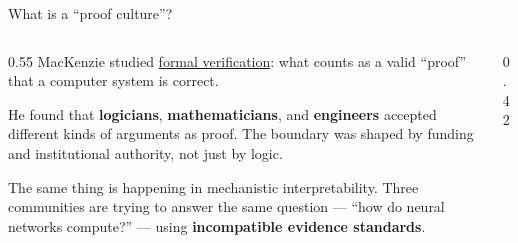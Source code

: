 \documentclass[aspectratio=169,11pt]{beamer}
\begin{document}
\begin{frame}{What is a ``proof culture''?}
\begin{columns}[T]
\begin{column}{0.55\textwidth}
{\small MacKenzie studied \href{https://mitpress.mit.edu/9780262632959/mechanizing-proof/}{formal verification}: what counts as a valid ``proof'' that a computer system is correct.}

\vspace{0.3em}
{\small He found that \textbf{logicians}, \textbf{mathematicians}, and \textbf{engineers} accepted different kinds of arguments as proof. The boundary was shaped by funding and institutional authority, not just by logic.}

\vspace{0.3em}
{\small The same thing is happening in mechanistic interpretability. Three communities are trying to answer the same question --- ``how do neural networks compute?'' --- using \textbf{incompatible evidence standards}.}
\end{column}
\begin{column}{0.42\textwidth}
\centering
\vspace{0.5em}
\end{column}
\end{columns}
\end{frame}
\end{document}

